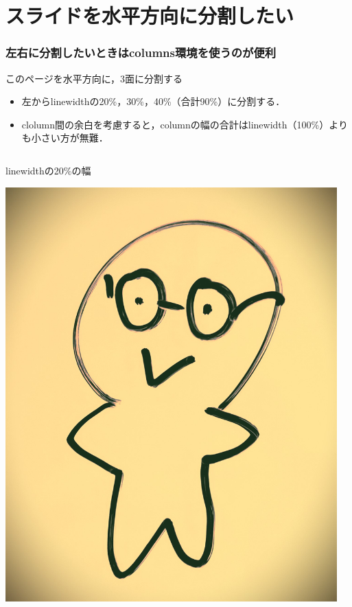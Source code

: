 \documentclass[unicode, 9pt, aspectratio=169]{beamer}
\begin{document}
\section{スライドを水平方向に分割したい}

\begin{frame}
\frametitle{左右に分割したいときはcolumns環境を使うのが便利}
\centering

\begin{block}{このページを水平方向に，3面に分割する}
\begin{itemize}
    \item 左からlinewidthの20\%，30\%，40\%（合計90\%）に分割する．
    \item clolumn間の余白を考慮すると，columnの幅の合計はlinewidth（100\%）よりも小さい方が無難．
\end{itemize}
\end{block}
\vspace{\baselineskip}

\begin{columns}
    \begin{column}{.2\linewidth}
        linewidthの20\%の幅

        \includegraphics[height=.25\textheight, width=\linewidth]{figs/fig_mod.jpg}
    \end{column}
    \begin{column}{.3\linewidth}
        \centering
        \hrulefill


\end{column}
\end{columns}
\end{frame}
\end{document}
